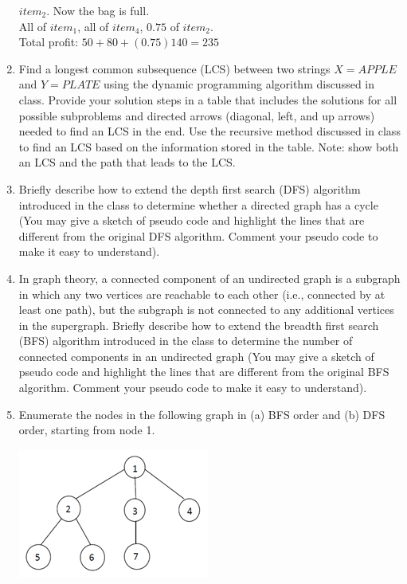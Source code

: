 \documentclass{article}
\begin{document}
\begin{enumerate}
            $item_2$. Now the bag is full.\\
            All of $item_1$, all of $item_4$, $0.75$ of $item_2$.\\
            Total profit: $50 + 80 + (0.75)140 = 235$
        \item Find a longest common subsequence (LCS) between two strings 
        $X = APPLE$ and $Y = PLATE$ using the dynamic programming algorithm 
        discussed in class. Provide your solution steps in a table that 
        includes the solutions for all possible subproblems and directed 
        arrows (diagonal, left, and up arrows) needed to find an LCS in the 
        end. Use the recursive method discussed in class to find an LCS based 
        on the information stored in the table. Note: show both an LCS and the 
        path that leads to the LCS.
        \item Briefly describe how to extend the depth first search (DFS) 
        algorithm introduced in the class to determine whether a directed 
        graph has a cycle (You may give a sketch of pseudo code and highlight 
        the lines that are different from the original DFS algorithm. Comment 
        your pseudo code to make it easy to understand).
        \item In graph theory, a connected component of an undirected graph is 
        a subgraph in which any two vertices are reachable to each other 
        (i.e., connected by at least one path), but the subgraph is not 
        connected to any additional vertices in the supergraph. Briefly 
        describe how to extend the breadth first search (BFS) algorithm 
        introduced in the class to determine the number of connected 
        components in an undirected graph (You may give a sketch of pseudo 
        code and highlight the lines that are different from the original BFS 
        algorithm. Comment your pseudo code to make it easy to understand).
        \item Enumerate the nodes in the following graph in (a) BFS order and 
        (b) DFS order, starting from node 1. 
            \begin{center}
                \includegraphics{tree1}

\end{center}
\end{enumerate}
\end{document}
